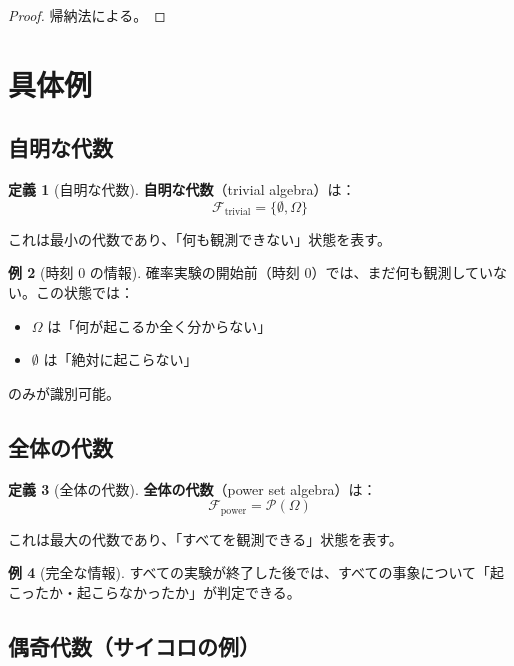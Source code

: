 \documentclass[12pt,a4paper,ja=standard]{bxjsarticle}
\theoremstyle{definition}
\newtheorem{definition}{定義}[section]
\newtheorem{example}[definition]{例}
\begin{document}
\begin{proof}
帰納法による。
\end{proof}

\section{具体例}\label{sec:examples}

\subsection{自明な代数}

\begin{definition}[自明な代数]
\textbf{自明な代数}（trivial algebra）は：
\[
\mathcal{F}_{\text{trivial}} = \{\emptyset, \Omega\}
\]

これは最小の代数であり、「何も観測できない」状態を表す。
\end{definition}

\begin{example}[時刻 0 の情報]
確率実験の開始前（時刻 0）では、まだ何も観測していない。この状態では：
\begin{itemize}
    \item $\Omega$ は「何が起こるか全く分からない」
    \item $\emptyset$ は「絶対に起こらない」
\end{itemize}
のみが識別可能。
\end{example}

\subsection{全体の代数}

\begin{definition}[全体の代数]
\textbf{全体の代数}（power set algebra）は：
\[
\mathcal{F}_{\text{power}} = \mathcal{P}(\Omega)
\]

これは最大の代数であり、「すべてを観測できる」状態を表す。
\end{definition}

\begin{example}[完全な情報]
すべての実験が終了した後では、すべての事象について「起こったか・起こらなかったか」が判定できる。
\end{example}

\subsection{偶奇代数（サイコロの例）}
\end{document}
